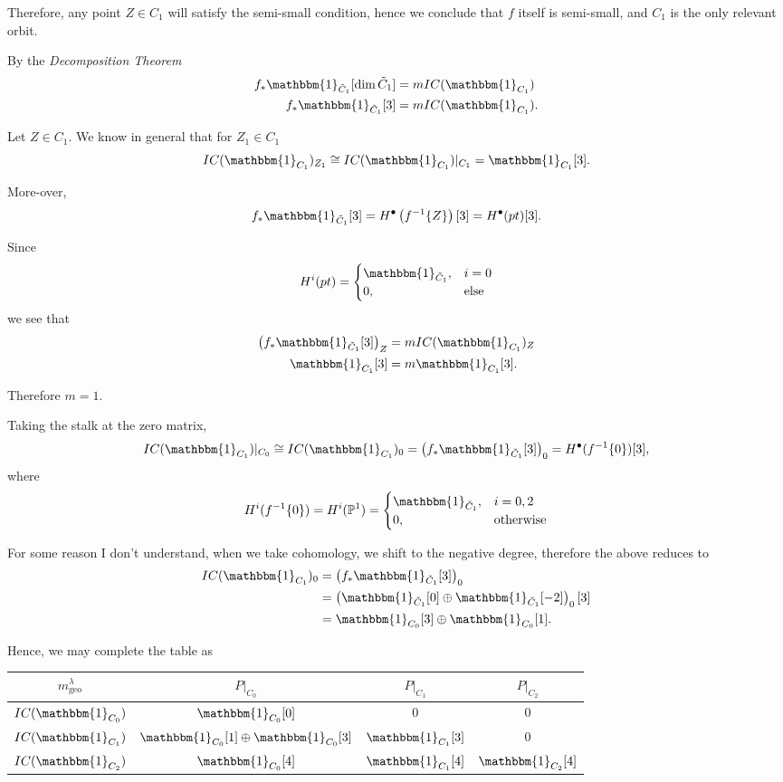 \documentclass{memoir}
\newcommand{\lb}{\left(}
\newcommand{\rb}{\right)}
\newcommand{\tx}{\text}
\theoremstyle{definition}
\begin{document}
	Therefore, any point $Z\in C_1$ will satisfy the semi-small condition, hence we conclude that $f$ itself is semi-small, and $C_1$ is the only relevant orbit. 
	
	By the \emph{Decomposition Theorem}
	\begin{align*}
		f_\ast\mathbbm{1}_{\tilde{C}_1}[\dim\tilde{C}_1]&=m IC(\mathbbm{1}_{C_1})\\
		f_\ast\mathbbm{1}_{\tilde{C}_1}[3]&=m IC(\mathbbm{1}_{C_1}). 
	\end{align*}
	
	Let $Z\in C_1$.  
	We know in general that for $Z_1\in C_1$
	$$IC(\mathbbm{1}_{C_1})_{Z_1}\cong IC(\mathbbm{1}_{C_1})|_{C_1}=\mathbbm{1}_{C_1}[3].$$
	
	More-over,
	$$f_\ast\mathbbm{1}_{\tilde{C}_1}[3]=H^\bullet\lb f^{-1}\{Z\}\rb[3]=H^\bullet(pt)[3].$$
	
	Since 
	$$H^i(pt)=\begin{cases}
		\mathbbm{1}_{\tilde{C}_1}, & i=0\\
		0, & \tx{else}
	\end{cases}$$
	we see that
	\begin{align*}
		\lb f_\ast\mathbbm{1}_{\tilde{C}_1}[3]\rb_Z&=mIC(\mathbbm{1}_{C_1})_Z\\
		\mathbbm{1}_{C_1}[3]&=m\mathbbm{1}_{C_1}[3].
	\end{align*}
	
	Therefore $m=1$.  
	
	Taking the stalk at the zero matrix,
	$$IC(\mathbbm{1}_{C_1})|_{C_0}\cong IC(\mathbbm{1}_{C_1})_0=\lb f_\ast\mathbbm{1}_{\tilde{C}_1}[3] \rb_0=H^\bullet(f^{-1}\{0\})[3],$$
	where 
	$$H^i(f^{-1}\{0\})=H^i(\mathbb{P}^1)=\begin{cases}
		\mathbbm{1}_{\tilde{C}_1}, & i=0,2\\
		0, & \tx{otherwise}
	\end{cases}$$
	
	For some reason I don't understand, when we take cohomology, we shift to the negative degree, therefore the above reduces to 
	\begin{align*}
		IC(\mathbbm{1}_{C_1})_0&=\lb f_\ast\mathbbm{1}_{\tilde{C}_1}[3]\rb_0\\
		&=\lb\mathbbm{1}_{\tilde{C}_1}[0]\oplus\mathbbm{1}_{\tilde{C}_1}[-2]\rb_0[3]\\
		&=\mathbbm{1}_{C_0}[3]\oplus\mathbbm{1}_{C_0}[1].
	\end{align*}
	
	Hence, we may complete the table as
	\begin{center}
		\begin{tabular}{c | c c c}
			$m_{\tx{geo}}^\lambda$ & $P|_{C_0}$ & $P|_{C_1}$ & $P|_{C_2}$ \\
			\hline
			$IC(\mathbbm{1}_{C_0})$ & $\mathbbm{1}_{C_0}[0]$ & 0 & 0 \\
			$IC(\mathbbm{1}_{C_1})$ & $\mathbbm{1}_{C_0}[1]\oplus\mathbbm{1}_{C_0}[3]$ & $\mathbbm{1}_{C_1}[3]$ & 0 \\
			$IC(\mathbbm{1}_{C_2})$ & $\mathbbm{1}_{C_0}[4]$ & $\mathbbm{1}_{C_1}[4]$ & $\mathbbm{1}_{C_2}[4]$
		\end{tabular}
	\end{center}
	
\end{document}
